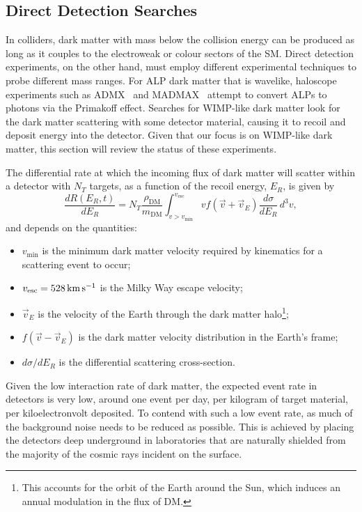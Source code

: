 \subsection{Direct Detection Searches}
In colliders, dark matter with mass below the collision energy can be produced as long as it couples to the electroweak or colour sectors of the SM. Direct detection experiments, on the other hand, must employ different experimental techniques to probe different mass ranges. 
For ALP dark matter that is wavelike, haloscope experiments 
such as ADMX~\cite{ADMX:2009iij_SQUIDbasedmicrowavecavity} and MADMAX~\cite{MADMAX:2019pub_mar_Newexperimentalapproach} 
attempt to convert ALPs to photons via the Primakoff effect. 
Searches for WIMP-like dark matter look for the dark matter scattering with some detector
material, causing it to recoil and deposit energy into the detector. Given that our focus is on WIMP-like dark matter, 
this section will review the status of these experiments.

The differential rate at which the incoming flux of dark matter will scatter
within a detector with $N_T$ targets, as a function of the recoil energy, $E_R$,
is given by
\begin{equation}
    \frac{d R(E_R, t)}{dE_R} = N_T \frac{\rho_\mathrm{DM}}{m_\mathrm{DM}}\int_{v>v_\mathrm{min}}^{v_\mathrm{esc}}v f(\Vec{v} + \vec{v}_E)\frac{d\sigma}{dE_R}\,d^3v,
    \label{eq:DD_rate}
\end{equation}
 and depends on the quantities:
\begin{itemize}
    \item $v_\mathrm{min}$ is the minimum dark matter velocity required by kinematics for a scattering event to occur;
    \item $v_\mathrm{esc} = 528{\rm \,km}{\rm \,s}^{-1}$ is the Milky Way escape velocity;
    \item $\vec{v}_E$ is the velocity of the Earth through the dark matter halo\footnote{This accounts for the orbit of the Earth around the Sun, which induces an annual modulation in the flux of DM.};
    \item $f(\vec{v} - \vec{v}_E)$ is the dark matter velocity distribution in the Earth's frame;
    \item $d\sigma/dE_R$ is the differential scattering cross-section.
\end{itemize}
Given the low interaction rate of dark matter, the expected event rate in detectors is very low, around one event per day, per kilogram of target material, per kiloelectronvolt deposited. To contend with such a low event rate, as much of the background noise needs to be reduced as possible. This is achieved by placing the detectors deep underground in laboratories that are naturally shielded from the majority of the cosmic rays incident on the surface. 

